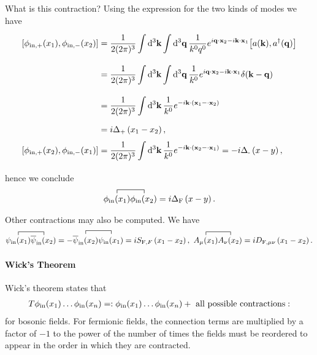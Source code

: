 What is this contraction? Using the expression for the two kinds of modes we have
\begin{align*}
	\comm{\phi_{\text{in}, +}(x_{1})}{\phi_{\text{in}, -}(x_{2})} &= \frac{1}{2(2\pi)^{3}}\integ[3]{}{}{\vb{k}}{\integ[3]{}{}{\vb{q}}{\frac{1}{k^{0}q^{0}}e^{i\vb{q}\cdot\vb{x}_{2} - i\vb{k}\cdot\vb{x}_{1}}\comm{a(\vb{k})}{a\adj(\vb{q})}}} \\
	&= \frac{1}{2(2\pi)^{3}}\integ[3]{}{}{\vb{k}}{\integ[3]{}{}{\vb{q}}{\frac{1}{k^{0}}e^{i\vb{q}\cdot\vb{x}_{2} - i\vb{k}\cdot\vb{x}_{1}}\delta(\vb{k} - \vb{q})}} \\
	&= \frac{1}{2(2\pi)^{3}}\integ[3]{}{}{\vb{k}}{\frac{1}{k^{0}}e^{-i\vb{k}\cdot(\vb{x}_{1} - \cdot\vb{x}_{2})}} \\
	&= i\kgprop{+}{x_{1} - x_{2}}, \\
	\comm{\phi_{\text{in}, +}(x_{2})}{\phi_{\text{in}, -}(x_{1})} &= \frac{1}{2(2\pi)^{3}}\integ[3]{}{}{\vb{k}}{\frac{1}{k^{0}}e^{-i\vb{k}\cdot(\vb{x}_{2} - \cdot\vb{x}_{1})}} = -i\kgprop{-}{x - y},
\end{align*}
hence we conclude
\begin{align*}
	\contraction{}{\phi_{\text{in}}(x_{1})}{}{\phi_{\text{in}}(x_{2})}\phi_{\text{in}}(x_{1})\phi_{\text{in}}(x_{2}) = i\kgprop{F}{x - y}.
\end{align*}

Other contractions may also be computed. We have
\begin{align*}
	\contraction{}{\psi_{\text{in}}(x_{1})}{}{\overline{\psi}_{\text{in}}(x_{2})}\psi_{\text{in}}(x_{1})\overline{\psi}_{\text{in}}(x_{2}) = -\contraction{}{\overline{\psi}_{\text{in}}(x_{2})}{}{\psi_{\text{in}}(x_{1})}\overline{\psi}_{\text{in}}(x_{2})\psi_{\text{in}}(x_{1}) = i\dirprop{F}{}{x_{1} - x_{2}},\ \contraction{}{A_{\mu}(x_{1})}{}{A_{\nu}(x_{2})}A_{\mu}(x_{1})A_{\nu}(x_{2}) = i\phprop{\mu}{\nu}{x_{1} - x_{2}}.
\end{align*}

\paragraph{Wick's Theorem}
Wick's theorem states that
\begin{align*}
	T\phi_{\text{in}}(x_{1})\dots\phi_{\text{in}}(x_{n}) = :\phi_{\text{in}}(x_{1})\dots\phi_{\text{in}}(x_{n}) + \text{ all possible contractions}:
\end{align*}
for bosonic fields. For fermionic fields, the connection terms are multiplied by a factor of $-1$ to the power of the number of times the fields must be reordered to appear in the order in which they are contracted.


